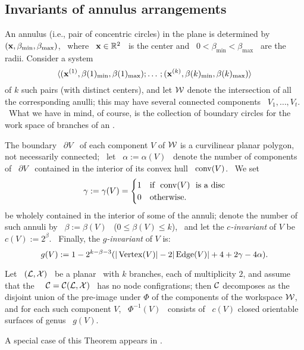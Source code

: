 \subsection{Invariants of annulus arrangements} \label{sica}

An annulus (i.e., pair of concentric circles) in the plane is
determined by \ $(\mathbf{x},\beta_{\min},\beta_{\max})$, \ where \
$\mathbf{x}\in\mathbb{R}^{2}$ \ is the center and \
$0<\beta_{\min}<\beta_{\max}$ \ are the radii. Consider a system
$$ \langle(\mathbf{x}\sp{({1})},\beta(1)_{\min},\beta(1)_{\max});
\dotsc;(\mathbf{x}\sp{({k})},\beta(k)_{\min},\beta(k)_{\max})\rangle
$$
of $k$ such pairs (with distinct centers), and let $\mathcal{W}$ denote the
intersection of all the corresponding anulli; this may have
several connected components \ $V_{1},\dotsc,V_{t}$. \ What we
have in mind, of course, is the collection of boundary circles for
the work space of branches of an \smech.

The boundary \ $\partial V$ \ of each component $V$ of $\mathcal{W}$ is a
curvilinear planar polygon, not necessarily connected; \ let \
$\alpha:=\alpha(V)$ \ denote the number of components of \
$\partial V$ \ contained in the interior of its convex hull \
$\operatorname{conv}(V)$. \ We set \ $$ \gamma:=\gamma(V)=\begin{cases}
1 & \text{if \ $\operatorname{conv}(V)$ \ is a disc}\\ 0 & \text{otherwise.}\end{cases} $$ %
be wholely contained in the interior of some of the annuli; denote the number
of such annuli by \ $\beta:=\beta(V)$ \ ($0\leq \beta(V)\leq k$), \ and let the
\emph{$c$-invariant} of $V$ be \ $c(V):=2^{\beta}$. \ Finally, the \emph{$g$-invariant} of $V$ is:
$$
g(V):=1-2^{k-\beta-3}(|\operatorname{Vertex}(V)|-2|\operatorname{Edge}(V)|+4+2\gamma-4\alpha).
$$

\begin{thm}
\label{thm:sss}
%
Let \ $(\mathcal{L},\mathcal{X})$  \ be a planar \smech\ with $k$ branches, each
of multiplicity $2$,  and assume that the \cspace\ \
$\mathcal{C}=\mathcal{C}(\mathcal{L},\mathcal{X})$ \ has no node configrations;  then $\mathcal{C}$
decomposes as the disjoint union of the pre-image under $\Phi$ of
the components of the workspace $\mathcal{W}$, and for each such component
$V$, \ $\Phi^{-1}(V)$ \ consists of \ $c(V)$ closed orientable
surfaces of genus \ $g(V)$.
%
\end{thm}

A special case of this Theorem appears in \cite{E}.

